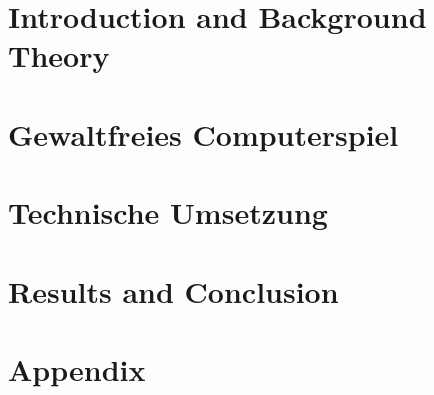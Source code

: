 
\addtolength{\evensidemargin}{-12mm}

%
%
\part[Introduction and Background Theory]{Introduction and Background Theory}
\label{part:introAndBackgroundTheory}





%
\part[Nonviolent computer game]{Gewaltfreies Computerspiel}
\label{part:nonviolentComputerGame}




%
\part[Technische Umsetzung]{Technische Umsetzung}
\label{part:technicalRealisation}




\part[Results and Conclusion]{Results and Conclusion}
\label{part:resultsAndConclusion}
 


%
%

\part*{Appendix}

\appendix %



